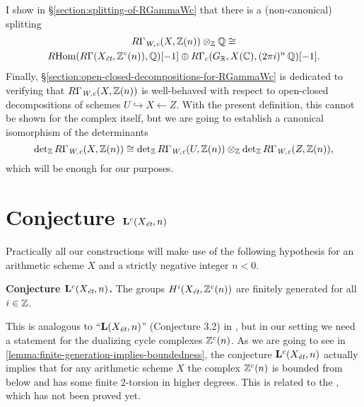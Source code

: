 I show in \S\ref{section:splitting-of-RGammaWc} that there is a (non-canonical)
splitting
\begin{multline*}
  R\Gamma_\text{\it W,c} (X,\mathbb{Z} (n))\otimes_{\mathbb{Z}} \mathbb{Q} \cong\\
  R\!\operatorname{Hom} (R\Gamma (X_\text{\it ét}, \mathbb{Z}^c (n)), \mathbb{Q}) [-1]
  \oplus
  R\Gamma_c (G_{\mathbb{R}}, X (\mathbb{C}), (2\pi i)^n\,\mathbb{Q}) [-1].
\end{multline*}
Finally, \S\ref{section:open-closed-decompositions-for-RGammaWc} is dedicated to
verifying that $R\Gamma_\text{\it W,c} (X,\mathbb{Z}(n))$ is well-behaved with respect
to open-closed decompositions of schemes
$U \hookrightarrow X \leftarrow Z$. With the present definition, this cannot be
shown for the complex itself, but we are going to establish a canonical
isomorphism of the determinants
\[ \det\nolimits_{\mathbb{Z}} R\Gamma_\text{\it W,c} (X,\mathbb{Z}(n)) \cong
  \det\nolimits_{\mathbb{Z}} R\Gamma_\text{\it W,c} (U,\mathbb{Z}(n))
  \otimes_{\mathbb{Z}}
  \det\nolimits_{\mathbb{Z}} R\Gamma_\text{\it W,c} (Z,\mathbb{Z}(n)), \]
which will be enough for our purposes.


\section{Conjecture $\mathbf{L}^c (X_\text{\it ét}, n)$}
\label{section:conjecture:Lc(X,n)}

Practically all our constructions will make use of the following hypothesis for
an arithmetic scheme $X$ and a strictly negative integer $n < 0$.

\begin{nameless}\textbf{Conjecture $\mathbf{L}^c (X_\text{\it ét}, n)$.}
  \label{conjecture:Lc(X,n)}
  The groups $H^i (X_\text{\it ét}, \mathbb{Z}^c (n))$ are finitely generated for all
  $i \in \mathbb{Z}$.
\end{nameless}

This is analogous to ``$\mathbf{L} (X_\text{\it ét}, n)$'' (Conjecture 3.2)
in \cite{Flach-Morin-16}, but in our setting we need a statement for the
dualizing cycle complexes $\mathbb{Z}^c (n)$. As we are going to see in
\ref{lemma:finite-generation-implies-boundedness}, the conjecture
$\mathbf{L}^c (X_\text{\it ét}, n)$ actually implies that for any arithmetic
scheme $X$ the complex $\mathbb{Z}^c (n)$ is bounded from below and has some finite
$2$-torsion in higher degrees. This is related to the
, which has not been proved yet.


